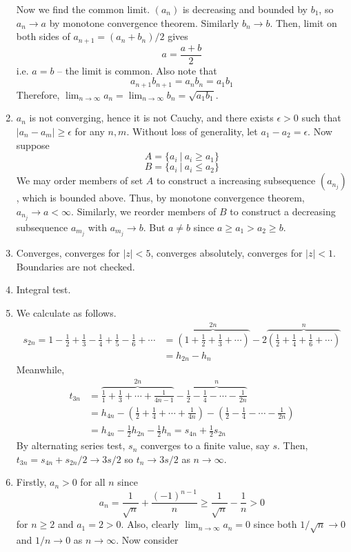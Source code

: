 \documentclass[10pt, a4paper, twoside]{report}
\begin{document}
\begin{enumerate}[{1.}]
    Now we find the common limit. \((a_n)\) is decreasing and bounded by \(b_1\), so \(a_n\to a\) by monotone convergence theorem. Similarly \(b_n\to b\). Then, limit on both sides of \(a_{n+1}=(a_n+b_n)/2\) gives 
    \[a=\frac{a+b}2\]
    i.e. \(a=b\) -- the limit is common. Also note that 
    \[a_{n+1}b_{n+1}=a_nb_n=a_1b_1\]
    Therefore, \(\lim_{n\to\infty}a_n=\lim_{n\to\infty}b_n=\sqrt{a_1b_1}\).
    \item \(a_n\) is not converging, hence it is not Cauchy, and there exists \(\epsilon>0\) such that \(|a_n-a_m|\geq\epsilon\) for any \(n,m\). Without loss of generality, let \(a_1-a_2=\epsilon\). Now suppose 
    \[A=\{a_i\:|\:a_i\geq a_1\}\]
    \[B=\{a_i\:|\:a_i\leq a_2\}\]
    We may order members of set \(A\) to construct a increasing subsequence \((a_{n_j})\), which is bounded above. Thus, by monotone convergence theorem, \(a_{n_j}\to a<\infty\). Similarly, we reorder members of \(B\) to construct a decreasing subsequence \(a_{m_j}\) with \(a_{m_j}\to b\). But \(a\neq b\) since \(a\geq a_1>a_2\geq b\).
    \item Converges, converges for \(|z|<5\), converges absolutely, converges for \(|z|<1\). Boundaries are not checked.
    \item Integral test.
    \item We calculate as follows.
    \begin{align*}
        s_{2n}=1-\frac 12+\frac 13-\frac 14+\frac 15-\frac 16+\cdots&=\overbrace{\left(1+\frac 12+\frac 13+\cdots\right)}^{2n}-2\overbrace{\left(\frac 12+\frac 14+\frac 16+\cdots\right)}^{n} \\
        &=h_{2n}-h_n
    \end{align*}
    Meanwhile,
    \begin{align*}
        t_{3n}&=\overbrace{\frac 11+\frac 13+\cdots+\frac 1{4n-1}}^{2n}-\overbrace{\frac 12-\frac 14-\cdots-\frac 1{2n}}^{n} \\
        &=h_{4n}-\left(\frac 12+\frac 14+\cdots+\frac 1{4n}\right)-\left(\frac 12-\frac 14-\cdots-\frac 1{2n}\right) \\
        &=h_{4n}-\frac 12h_{2n}-\frac 12{h_n}=s_{4n}+\frac 12s_{2n}
    \end{align*}
    By alternating series test, \(s_n\) converges to a finite value, say \(s\). Then, \(t_{3n}=s_{4n}+s_{2n}/2\to 3s/2\) so \(t_n\to 3s/2\) as \(n\to\infty\).
    \item Firstly, \(a_n>0\) for all \(n\) since 
    \[a_n=\frac 1{\sqrt{n}}+\frac{(-1)^{n-1}}{n}\geq\frac{1}{\sqrt{n}}-\frac 1n>0\]
    for \(n\geq 2\) and \(a_1=2>0\). Also, clearly \(\lim_{n\to\infty}a_n=0\) since both \(1/\sqrt{n}\to 0\) and \(1/n\to 0\) as \(n\to\infty\). Now consider 

\end{enumerate}
\end{document}
